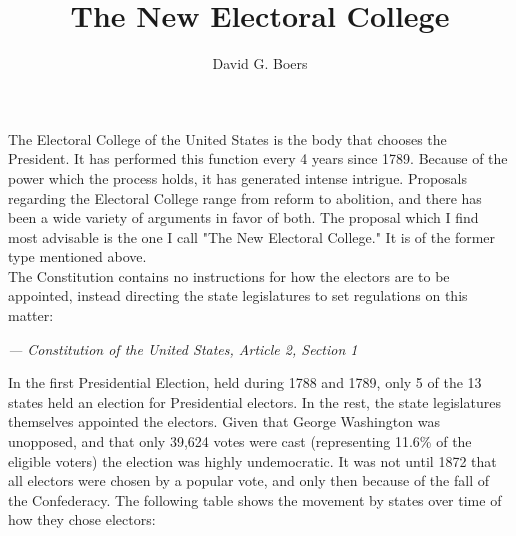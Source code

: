 \documentclass{article}
\title{The New Electoral College}
\author{David G. Boers}
\begin{document}
    \maketitle
    The Electoral College of the United States is the body that chooses the President. It has performed this function every 4 years since 1789. Because of the power which the process holds, it has generated intense intrigue. Proposals regarding the Electoral College range from reform to abolition, and there has been a wide variety of arguments in favor of both. The proposal which I find most advisable is the one I call "The New Electoral College." It is of the former type mentioned above.\\
    
    The Constitution contains no instructions for how the electors are to be appointed, instead directing the state legislatures to set regulations on this matter:\\

    \begin{flushright}\textit{--- Constitution of the United States, Article 2, Section 1}\end{flushright}%

    In the first Presidential Election, held during 1788 and 1789, only 5 of the 13 states held an election for Presidential electors. In the rest, the state legislatures themselves appointed the electors. Given that George Washington was unopposed, and that only 39,624 votes were cast (representing 11.6\% of the eligible voters) the election was highly undemocratic. It was not until 1872 that all electors were chosen by a popular vote, and only then because of the fall of the Confederacy. The following table shows the movement by states over time of how they chose electors:\\
\end{document}
